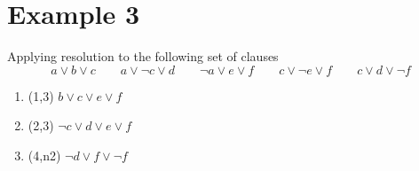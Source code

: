 \documentclass{article}[18pt]
\begin{document}
\section{Example 3}
Applying resolution to the following set of clauses
$$a\lor b\lor c \qquad a\lor\lnot c\lor d \qquad \lnot a\lor e\lor f \qquad c\lor \lnot e\lor f \qquad c\lor d\lor \lnot f$$
\begin{enumerate}
	\item (1,3) $b\lor c\lor e\lor f$
	\item (2,3) $\lnot c\lor d\lor e \lor f$
	\item (4,n2) $\lnot d \lor f \lor \lnot f$
\end{enumerate}
\end{document}
